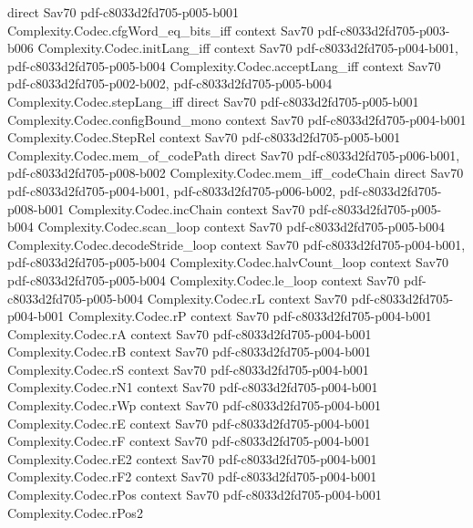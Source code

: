 \begin{theorem}
  {direct}
  {Sav70}
  {pdf-c8033d2fd705-p005-b001}
\proofstep
  {Complexity.Codec.cfgWord_eq_bits_iff}
  {context}
  {Sav70}
  {pdf-c8033d2fd705-p003-b006}
\proofstep
  {Complexity.Codec.initLang_iff}
  {context}
  {Sav70}
  {pdf-c8033d2fd705-p004-b001,
    pdf-c8033d2fd705-p005-b004}
\proofstep
  {Complexity.Codec.acceptLang_iff}
  {context}
  {Sav70}
  {pdf-c8033d2fd705-p002-b002,
    pdf-c8033d2fd705-p005-b004}
\proofstep
  {Complexity.Codec.stepLang_iff}
  {direct}
  {Sav70}
  {pdf-c8033d2fd705-p005-b001}
\proofstep
  {Complexity.Codec.configBound_mono}
  {context}
  {Sav70}
  {pdf-c8033d2fd705-p004-b001}
\proofstep
  {Complexity.Codec.StepRel}
  {context}
  {Sav70}
  {pdf-c8033d2fd705-p005-b001}
\proofstep
  {Complexity.Codec.mem_of_codePath}
  {direct}
  {Sav70}
  {pdf-c8033d2fd705-p006-b001,
    pdf-c8033d2fd705-p008-b002}
\proofstep
  {Complexity.Codec.mem_iff_codeChain}
  {direct}
  {Sav70}
  {pdf-c8033d2fd705-p004-b001,
    pdf-c8033d2fd705-p006-b002,
    pdf-c8033d2fd705-p008-b001}
\proofstep
  {Complexity.Codec.incChain}
  {context}
  {Sav70}
  {pdf-c8033d2fd705-p005-b004}
\proofstep
  {Complexity.Codec.scan_loop}
  {context}
  {Sav70}
  {pdf-c8033d2fd705-p005-b004}
\proofstep
  {Complexity.Codec.decodeStride_loop}
  {context}
  {Sav70}
  {pdf-c8033d2fd705-p004-b001,
    pdf-c8033d2fd705-p005-b004}
\proofstep
  {Complexity.Codec.halvCount_loop}
  {context}
  {Sav70}
  {pdf-c8033d2fd705-p005-b004}
\proofstep
  {Complexity.Codec.le_loop}
  {context}
  {Sav70}
  {pdf-c8033d2fd705-p005-b004}
\proofstep
  {Complexity.Codec.rL}
  {context}
  {Sav70}
  {pdf-c8033d2fd705-p004-b001}
\proofstep
  {Complexity.Codec.rP}
  {context}
  {Sav70}
  {pdf-c8033d2fd705-p004-b001}
\proofstep
  {Complexity.Codec.rA}
  {context}
  {Sav70}
  {pdf-c8033d2fd705-p004-b001}
\proofstep
  {Complexity.Codec.rB}
  {context}
  {Sav70}
  {pdf-c8033d2fd705-p004-b001}
\proofstep
  {Complexity.Codec.rS}
  {context}
  {Sav70}
  {pdf-c8033d2fd705-p004-b001}
\proofstep
  {Complexity.Codec.rN1}
  {context}
  {Sav70}
  {pdf-c8033d2fd705-p004-b001}
\proofstep
  {Complexity.Codec.rWp}
  {context}
  {Sav70}
  {pdf-c8033d2fd705-p004-b001}
\proofstep
  {Complexity.Codec.rE}
  {context}
  {Sav70}
  {pdf-c8033d2fd705-p004-b001}
\proofstep
  {Complexity.Codec.rF}
  {context}
  {Sav70}
  {pdf-c8033d2fd705-p004-b001}
\proofstep
  {Complexity.Codec.rE2}
  {context}
  {Sav70}
  {pdf-c8033d2fd705-p004-b001}
\proofstep
  {Complexity.Codec.rF2}
  {context}
  {Sav70}
  {pdf-c8033d2fd705-p004-b001}
\proofstep
  {Complexity.Codec.rPos}
  {context}
  {Sav70}
  {pdf-c8033d2fd705-p004-b001}
\proofstep
  {Complexity.Codec.rPos2}

\end{theorem}
